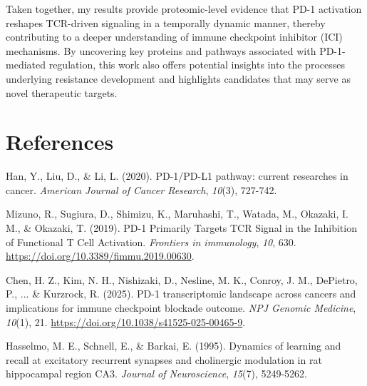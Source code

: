 \documentclass{article}
\begin{document}
    Taken together, my results provide proteomic-level evidence that PD-1 activation reshapes TCR-driven signaling in a temporally dynamic manner, thereby contributing to a deeper understanding of immune checkpoint inhibitor (ICI) mechanisms. By uncovering key proteins and pathways associated with PD-1-mediated regulation, this work also offers potential insights into the processes underlying resistance development and highlights candidates that may serve as novel therapeutic targets.

  \section*{References}

  {
    \small

    \begin{enumerate}[label={[{\arabic*}]}, leftmargin=*, itemindent=\parindent, align=left, labelsep=0.5em, itemsep=0.25\baselineskip]
      \item Han, Y., Liu, D., \& Li, L. (2020). PD-1/PD-L1 pathway: current researches in cancer. \textit{American Journal of Cancer Research}, \textit{10}(3), 727-742.
      \item Mizuno, R., Sugiura, D., Shimizu, K., Maruhashi, T., Watada, M., Okazaki, I. M., \& Okazaki, T. (2019). PD-1 Primarily Targets TCR Signal in the Inhibition of Functional T Cell Activation. \textit{Frontiers in immunology}, \textit{10}, 630. \url{https://doi.org/10.3389/fimmu.2019.00630}.
      \item Chen, H. Z., Kim, N. H., Nishizaki, D., Nesline, M. K., Conroy, J. M., DePietro, P., ... \& Kurzrock, R. (2025). PD-1 transcriptomic landscape across cancers and implications for immune checkpoint blockade outcome. \textit{NPJ Genomic Medicine}, \textit{10}(1), 21. \url{https://doi.org/10.1038/s41525-025-00465-9}.
      \item Hasselmo, M. E., Schnell, E., \& Barkai, E. (1995). Dynamics of learning and recall at excitatory recurrent synapses and cholinergic modulation in rat hippocampal region CA3. \textit{Journal of Neuroscience}, \textit{15}(7), 5249-5262.
    \end{enumerate}
  }
\end{document}
